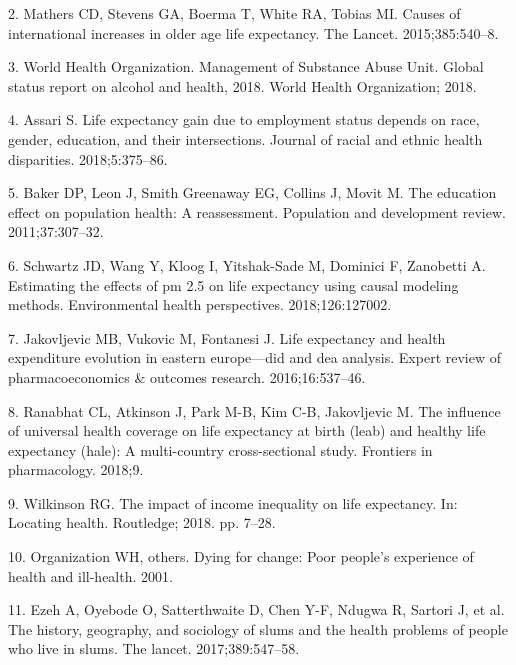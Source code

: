 \documentclass[]{elsarticle} %
\begin{document}
\leavevmode\hypertarget{ref-mathers2015causes}{}%
2. Mathers CD, Stevens GA, Boerma T, White RA, Tobias MI. Causes of international increases in older age life expectancy. The Lancet. 2015;385:540--8.

\leavevmode\hypertarget{ref-world2018global}{}%
3. World Health Organization. Management of Substance Abuse Unit. Global status report on alcohol and health, 2018. World Health Organization; 2018.

\leavevmode\hypertarget{ref-assari2018life}{}%
4. Assari S. Life expectancy gain due to employment status depends on race, gender, education, and their intersections. Journal of racial and ethnic health disparities. 2018;5:375--86.

\leavevmode\hypertarget{ref-baker2011education}{}%
5. Baker DP, Leon J, Smith Greenaway EG, Collins J, Movit M. The education effect on population health: A reassessment. Population and development review. 2011;37:307--32.

\leavevmode\hypertarget{ref-schwartz2018estimating}{}%
6. Schwartz JD, Wang Y, Kloog I, Yitshak-Sade M, Dominici F, Zanobetti A. Estimating the effects of pm 2.5 on life expectancy using causal modeling methods. Environmental health perspectives. 2018;126:127002.

\leavevmode\hypertarget{ref-jakovljevic2016life}{}%
7. Jakovljevic MB, Vukovic M, Fontanesi J. Life expectancy and health expenditure evolution in eastern europe---did and dea analysis. Expert review of pharmacoeconomics \& outcomes research. 2016;16:537--46.

\leavevmode\hypertarget{ref-ranabhat2018influence}{}%
8. Ranabhat CL, Atkinson J, Park M-B, Kim C-B, Jakovljevic M. The influence of universal health coverage on life expectancy at birth (leab) and healthy life expectancy (hale): A multi-country cross-sectional study. Frontiers in pharmacology. 2018;9.

\leavevmode\hypertarget{ref-wilkinson2018impact}{}%
9. Wilkinson RG. The impact of income inequality on life expectancy. In: Locating health. Routledge; 2018. pp. 7--28.

\leavevmode\hypertarget{ref-world2001dying}{}%
10. Organization WH, others. Dying for change: Poor people's experience of health and ill-health. 2001.

\leavevmode\hypertarget{ref-ezeh2017history}{}%
11. Ezeh A, Oyebode O, Satterthwaite D, Chen Y-F, Ndugwa R, Sartori J, et al. The history, geography, and sociology of slums and the health problems of people who live in slums. The lancet. 2017;389:547--58.
\end{document}
